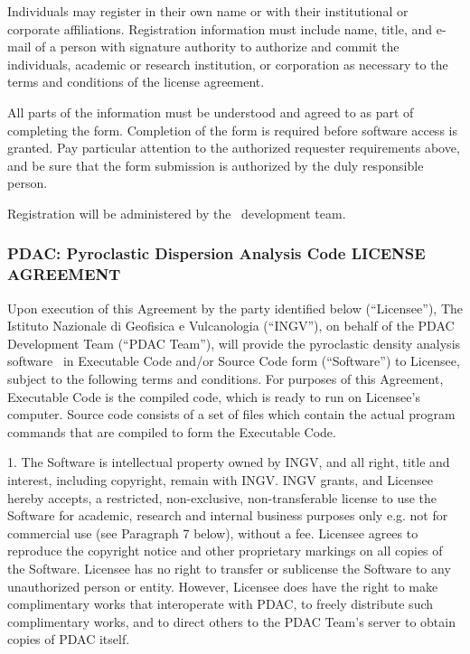 Individuals may register in their own name or with their institutional or
corporate affiliations. Registration information must include name, title, 
and e-mail of a person with signature authority to authorize and commit the
individuals, academic or research institution, or corporation as necessary 
to the terms and conditions of the license agreement.

All parts of the information must be understood and agreed to as part of
completing the form. Completion of the form is required before software 
access is granted. Pay particular attention to the authorized requester 
requirements above, and be sure that the form submission is authorized 
by the duly responsible person.

Registration will be administered by the \PDAC\ development team.

\newpage
\subsubsection*{PDAC: Pyroclastic Dispersion Analysis Code LICENSE AGREEMENT}

Upon execution of this Agreement by the party identified below (``Licensee''),
The Istituto Nazionale di Geofisica e Vulcanologia (``INGV''), on 
behalf of the PDAC Development Team (``PDAC Team''),
will provide the pyroclastic density analysis software \PDAC\ in Executable 
Code and/or Source Code form (``Software'') to Licensee, subject to 
the following terms and conditions. For purposes of this Agreement, 
Executable Code is the compiled code, which is ready to run on Licensee's 
computer. Source code consists of a set of files which contain the 
actual program commands that are compiled to form the Executable Code.

1. The Software is intellectual property owned by INGV, and all 
right, title and interest, including copyright, remain with INGV. 
INGV grants, and Licensee hereby accepts, a restricted, non-exclusive, 
non-transferable license to use the Software for academic, research 
and internal business purposes only e.g. not for commercial use 
(see Paragraph 7 below), without a fee. Licensee agrees to reproduce 
the copyright notice and other proprietary markings on all copies of 
the Software. Licensee has no right to transfer or sublicense the 
Software to any unauthorized person or entity. However, Licensee does 
have the right to make complimentary works that interoperate with PDAC, 
to freely distribute such complimentary works, and to direct others 
to the PDAC Team's server to obtain copies of PDAC itself.

